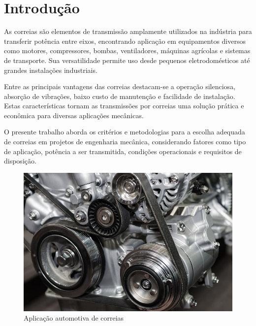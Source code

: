 
\chapter{Introdução}

As correias são elementos de transmissão amplamente utilizados na indústria para transferir potência entre eixos, encontrando aplicação em equipamentos diversos como motores, compressores, bombas, ventiladores, máquinas agrícolas e sistemas de transporte. Sua versatilidade permite uso desde pequenos eletrodomésticos até grandes instalações industriais.

Entre as principais vantagens das correias destacam-se a operação silenciosa, absorção de vibrações, baixo custo de manutenção e facilidade de instalação. Estas características tornam as transmissões por correias uma solução prática e econômica para diversas aplicações mecânicas.

O presente trabalho aborda os critérios e metodologias para a escolha adequada de correias em projetos de engenharia mecânica, considerando fatores como tipo de aplicação, potência a ser transmitida, condições operacionais e requisitos de disposição.


\begin{figure}[h]
	\centering
	\caption{Aplicação automotiva de correias}
    \label{correia_carro}
	\includegraphics[scale=0.5]{Imagens/correia_carro.jpg}
\end{figure}